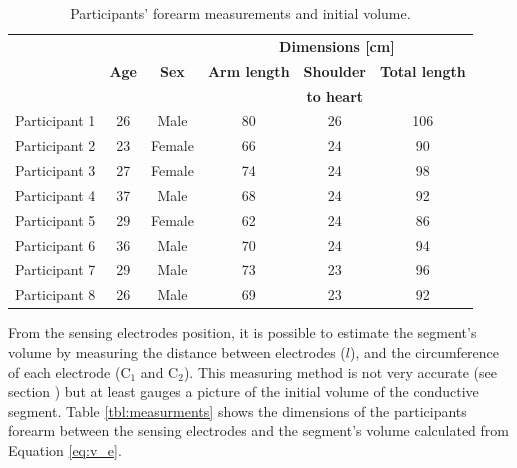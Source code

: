 \begin{table}[!htbp] %
	\caption{Participants' forearm measurements and initial volume.}
	\label{tbl:physiological}
	\centering
	\begin{tabular}{lcc|ccc}
		\toprule
		&              &              &         \multicolumn{3}{c}{\textbf{Dimensions [\si{\cm}]}}         \\
		& \textbf{Age} & \textbf{Sex} & \textbf{Arm length} & \textbf{Shoulder} & \textbf{Total length} \\
		&              &              &                     &  \textbf{to heart}   &                       \\ \midrule
		Participant 1 &      26      &     Male     &         80          &          26          &          106          \\
		Participant 2 &      23      &    Female    &         66          &          24          &          90           \\
		Participant 3 &      27      &    Female    &         74          &          24          &          98           \\
		Participant 4 &      37      &     Male     &         68          &          24          &          92           \\
		Participant 5 &      29      &    Female    &         62          &          24          &          86           \\
		Participant 6 &      36      &     Male     &         70          &          24          &          94           \\
		Participant 7 &      29      &     Male     &         73          &          23          &          96           \\
		Participant 8 &      26      &     Male     &         69          &          23          &          92           \\ \bottomrule
	\end{tabular}
\end{table}

From the sensing electrodes position, it is possible to estimate the segment's volume by measuring the distance between electrodes ($l$), and the circumference of each electrode (C$_1$ and C$_2$).  This measuring method is not very accurate (see section ) but at least gauges a picture of the initial volume of the conductive segment. Table \ref{tbl:measurments} shows the dimensions of the participants forearm between the sensing electrodes and the segment's volume calculated from Equation \ref{eq:v_e}.


